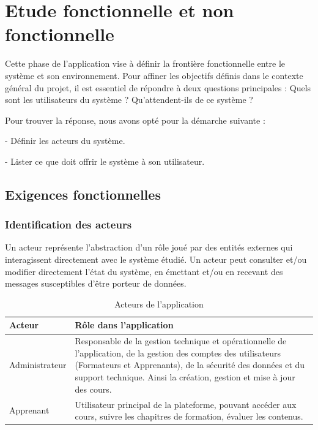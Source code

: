 \section{Etude fonctionnelle et non fonctionnelle}

Cette phase de l’application vise à définir la frontière fonctionnelle entre le système et son environnement. Pour affiner les objectifs définis dans le contexte général du projet, il est essentiel de répondre à deux questions principales : Quels sont les utilisateurs du système ? Qu'attendent-ils de ce système ?

Pour trouver la réponse, nous avons opté pour la démarche suivante : 

- Définir les acteurs du système. 

- Lister ce que doit offrir le système à son utilisateur.


\subsection{Exigences fonctionnelles}
\subsubsection{Identification des acteurs}

Un acteur représente l’abstraction d’un rôle joué par des entités externes qui
interagissent directement avec le système étudié. Un acteur peut consulter et/ou
modifier directement l’état du système, en émettant et/ou en recevant des messages
susceptibles d'être porteur de données.

\begin{table}[htbp]
    \centering
    \begin{tabular}{|m{5cm}|m{10cm}|}
        \hline
        \textbf{Acteur} & \textbf{Rôle dans l'application} \\
        \hline
        Administrateur & Responsable de la gestion technique et opérationnelle de l'application, de la gestion des comptes des utilisateurs (Formateurs et Apprenants), de la sécurité des données et du support technique. Ainsi la création, gestion et mise à jour des cours. \\
        \hline
        Apprenant & Utilisateur principal de la plateforme, pouvant accéder aux cours, suivre les chapitres de formation, évaluer les contenus. \\
        \hline
    \end{tabular}
    \caption{Acteurs de l'application}
    \label{tab:roles}
\end{table}


